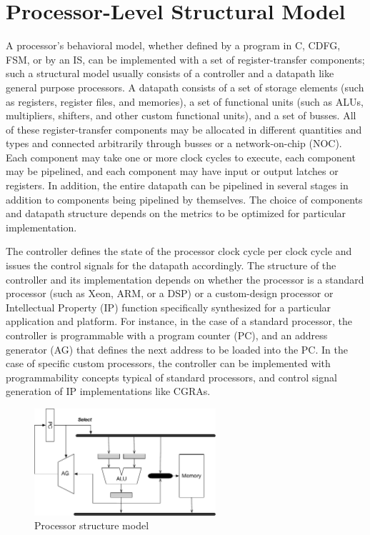 \section{Processor-Level Structural Model}

A processor’s behavioral model, whether defined by a program in C, CDFG, FSM, or by an IS, can be implemented with a set of register-transfer components; such a structural model usually consists of a controller and a datapath like general purpose processors.
A datapath consists of a set of storage elements (such as registers, register files, and memories), a set of functional units (such as ALUs, multipliers, shifters, and other custom functional units), and a set of busses.
All of these register-transfer components may be allocated in different quantities and types and connected arbitrarily through busses or a network-on-chip (NOC).
Each component may take one or more clock cycles to execute, each component may be pipelined, and each component may have input or output latches or registers.
In addition, the entire datapath can be pipelined in several stages in addition to components being pipelined by themselves.
The choice of components and datapath structure depends on the metrics to be optimized for particular implementation.

The controller defines the state of the processor clock cycle per clock cycle and issues the control signals for the datapath accordingly.
The structure of the controller and its implementation depends on whether the processor is a standard processor (such as Xeon, ARM, or a DSP) or a custom-design processor or Intellectual Property (IP) function specifically synthesized for a particular application and platform.
For instance, in the case of a standard processor, the controller is programmable with a program counter (PC), and an address generator (AG) that defines the next address to be loaded into the PC.
In the case of specific custom processors, the controller can be implemented with programmability concepts typical of standard processors, and control signal generation of IP implementations like CGRAs.

\begin{figure}[h]
    \centering
    \includegraphics[width=0.6\textwidth]{figures/Introduction/Processor_Structure.pdf}
    \caption{Processor structure model}
    \label{fig:proc_synthesis}
\end{figure}



